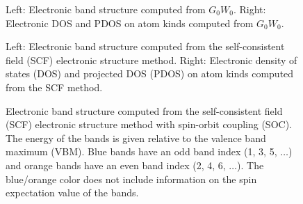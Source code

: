 \documentclass[11pt, a4paper]{scrartcl}
\newlength\figureheight
\newlength\figurewidth
\begin{document}
\begin{figure}[h!]
\centering
\setlength\figureheight{11cm} 
\setlength{}

\hspace{-2.5em}
\setlength{}

\caption{Left: Electronic band structure computed from $G_0W_0$. Right: Electronic DOS and PDOS on atom kinds computed from $G_0W_0$.}
\end{figure}


\begin{figure}[h!]
\centering
\setlength\figureheight{11cm} 
\setlength{}

\hspace{-2.5em}
\setlength{}

\caption{Left: Electronic band structure computed from the self-consistent field (SCF) electronic structure method. Right: Electronic density of states (DOS) and projected DOS (PDOS) on atom kinds computed from the SCF method.}
    \label{f2}
\end{figure}





\begin{figure}[h!]
\centering
\setlength\figureheight{11cm} 
\setlength{}

\hfill

\caption{Electronic band structure computed from the self-consistent field (SCF) electronic structure method with spin-orbit coupling (SOC). The energy of the bands is given relative to the valence band maximum (VBM).
%
Blue bands have an odd band index (1, 3, 5, $\ldots$) and orange bands have an even band index (2, 4, 6, $\ldots$). 
%
The blue/orange color does not include information on the spin expectation value of the bands. 
}
    \label{f3}
\end{figure}
\end{document}
